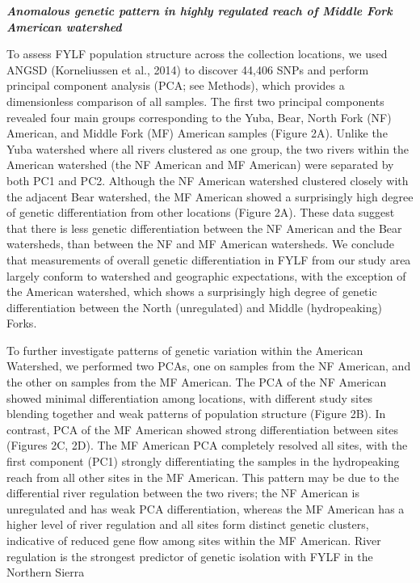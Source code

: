 \documentclass[twoside,12pt,final]{ucthesis-CA2012}
\begin{document}
\begin{ucmainmatter}
\textbf{\emph{Anomalous genetic pattern in highly regulated reach of
Middle Fork American watershed}}

To assess FYLF population structure across the collection locations, we
used ANGSD (Korneliussen et al., 2014) to discover 44,406 SNPs and
perform principal component analysis (PCA; see Methods), which provides
a dimensionless comparison of all samples. The first two principal
components revealed four main groups corresponding to the Yuba, Bear,
North Fork (NF) American, and Middle Fork (MF) American samples (Figure
2A). Unlike the Yuba watershed where all rivers clustered as one group,
the two rivers within the American watershed (the NF American and MF
American) were separated by both PC1 and PC2. Although the NF American
watershed clustered closely with the adjacent Bear watershed, the MF
American showed a surprisingly high degree of genetic differentiation
from other locations (Figure 2A). These data suggest that there is less
genetic differentiation between the NF American and the Bear watersheds,
than between the NF and MF American watersheds. We conclude that
measurements of overall genetic differentiation in FYLF from our study
area largely conform to watershed and geographic expectations, with the
exception of the American watershed, which shows a surprisingly high
degree of genetic differentiation between the North (unregulated) and
Middle (hydropeaking) Forks.

To further investigate patterns of genetic variation within the American
Watershed, we performed two PCAs, one on samples from the NF American,
and the other on samples from the MF American. The PCA of the NF
American showed minimal differentiation among locations, with different
study sites blending together and weak patterns of population structure
(Figure 2B). In contrast, PCA of the MF American showed strong
differentiation between sites (Figures 2C, 2D). The MF American PCA
completely resolved all sites, with the first component (PC1) strongly
differentiating the samples in the hydropeaking reach from all other
sites in the MF American. This pattern may be due to the differential
river regulation between the two rivers; the NF American is unregulated
and has weak PCA differentiation, whereas the MF American has a higher
level of river regulation and all sites form distinct genetic clusters,
indicative of reduced gene flow among sites within the MF American.
River regulation is the strongest predictor of genetic isolation with
FYLF in the Northern Sierra


\end{ucmainmatter}
\end{document}
